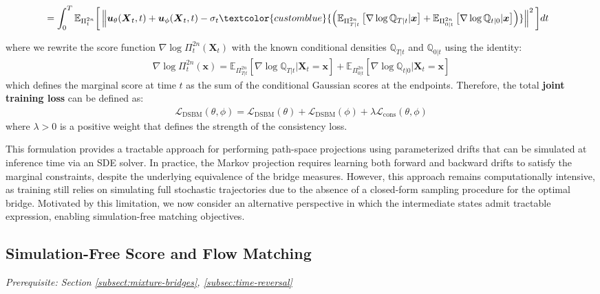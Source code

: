 \documentclass{article}
\newcommand{\bluetext}[1]{\textcolor{customblue}{#1}}
\begin{document}
{\begin{small}
\begin{align}
    &=\int_0^T\mathbb{E}_{\Pi_t^{2n}}\bigg[\left\|\boldsymbol{u}_\theta(\boldsymbol{X}_t,t)+\boldsymbol{u}_\phi(\boldsymbol{X}_t,t)-\sigma_t\bluetext{\left(\mathbb{E}_{\Pi_{T|t}^{2n}}\left[\nabla \log \mathbb{Q}_{T|t}|\boldsymbol{x}\right]+\mathbb{E}_{\Pi_{0|t}^{2n}}\left[\nabla \log \mathbb{Q}_{t|0}|\boldsymbol{x}\right]\right)}\right\|^2\bigg]dt\nonumber
\end{align}
\end{small}
where we rewrite the score function $\nabla \log \Pi^{2n}_t(\boldsymbol{X}_t)$ with the known conditional densities $\mathbb{Q}_{T|t}$ and $\mathbb{Q}_{0|t}$ using the identity:
\begin{align}
    \nabla  \log \Pi^{2n}_t(\boldsymbol{x})=\mathbb{E}_{\Pi_{T|t}^{2n}}\left[\nabla\log \mathbb{Q}_{T|t}|\boldsymbol{X}_t=\boldsymbol{x}\right]+\mathbb{E}_{\Pi_{0|t}^{2n}}\left[\nabla\log \mathbb{Q}_{t|0}|\boldsymbol{X}_t=\boldsymbol{x}\right]
\end{align}
which defines the marginal score at time $t$ as the sum of the conditional Gaussian scores at the endpoints. Therefore, the total \textbf{joint training loss} can be defined as:
\begin{align}
    \mathcal{L}_{\text{DSBM}}(\theta, \phi)=\mathcal{L}_{\text{DSBM}}(\theta)+\mathcal{L}_{\text{DSBM}}(\phi)+\lambda\mathcal{L}_{\text{cons}}(\theta, \phi)
\end{align}
where $\lambda>0$ is a positive weight that defines the strength of the consistency loss.
}
This formulation provides a tractable approach for performing path-space projections using parameterized drifts that can be simulated at inference time via an SDE solver. In practice, the Markov projection requires learning both forward and backward drifts to satisfy the marginal constraints, despite the underlying equivalence of the bridge measures. However, this approach remains computationally intensive, as training still relies on simulating full stochastic trajectories due to the absence of a closed-form sampling procedure for the optimal bridge. Motivated by this limitation, we now consider an alternative perspective in which the intermediate states admit tractable expression, enabling simulation-free matching objectives. 

\subsection{Simulation-Free Score and Flow Matching}
\label{subsec:score-and-flow}
\textit{Prerequisite: Section \ref{subsect:mixture-bridges}, \ref{subsec:time-reversal}}
\end{document}
